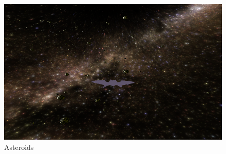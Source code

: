 \documentclass[a4paper,12pt]{article}
\begin{document}
\begin{figure}[h!]
        \centering
        \includegraphics[width=1.2\textwidth]{bild/asteroid.png}
        \caption{Asteroids}
        \label{fig:asteroids}
\end{figure}
\end{document}
